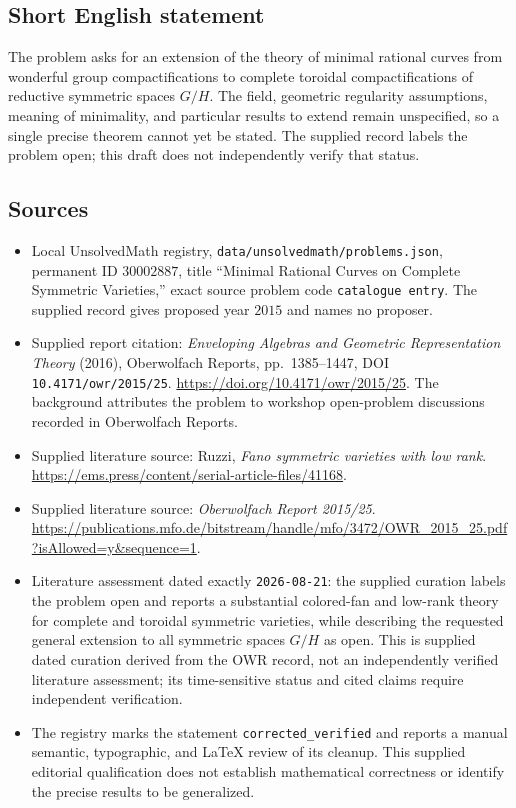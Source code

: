 \documentclass[11pt]{article}
\begin{document}
\subsection{Short English statement}
The problem asks for an extension of the theory of minimal rational curves from wonderful group compactifications to complete toroidal compactifications of reductive symmetric spaces \(G/H\). The field, geometric regularity assumptions, meaning of minimality, and particular results to extend remain unspecified, so a single precise theorem cannot yet be stated. The supplied record labels the problem open; this draft does not independently verify that status.
\subsection{Sources}
\begin{itemize}
\item Local UnsolvedMath registry, \texttt{data/unsolvedmath/problems.json}, permanent ID \(30002887\), title ``Minimal Rational Curves on Complete Symmetric Varieties,'' exact source problem code \texttt{catalogue entry}. The supplied record gives proposed year \(2015\) and names no proposer.
\item Supplied report citation: \emph{Enveloping Algebras and Geometric Representation Theory} (2016), Oberwolfach Reports, pp.\ 1385--1447, DOI \texttt{10.4171/owr/2015/25}. \url{https://doi.org/10.4171/owr/2015/25}. The background attributes the problem to workshop open-problem discussions recorded in Oberwolfach Reports.
\item Supplied literature source: Ruzzi, \emph{Fano symmetric varieties with low rank}. \url{https://ems.press/content/serial-article-files/41168}.
\item Supplied literature source: \emph{Oberwolfach Report 2015/25}. \url{https://publications.mfo.de/bitstream/handle/mfo/3472/OWR_2015_25.pdf?isAllowed=y&sequence=1}.
\item Literature assessment dated exactly \texttt{2026-08-21}: the supplied curation labels the problem open and reports a substantial colored-fan and low-rank theory for complete and toroidal symmetric varieties, while describing the requested general extension to all symmetric spaces \(G/H\) as open. This is supplied dated curation derived from the OWR record, not an independently verified literature assessment; its time-sensitive status and cited claims require independent verification.
\item The registry marks the statement \texttt{corrected\_verified} and reports a manual semantic, typographic, and LaTeX review of its cleanup. This supplied editorial qualification does not establish mathematical correctness or identify the precise results to be generalized.
\end{itemize}
\end{document}
